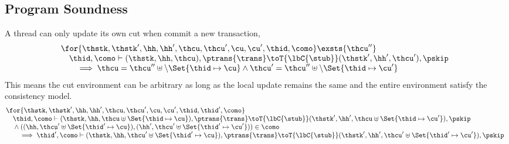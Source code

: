 \subsection{Program Soundness}
\begin{lem}
\label{lem:locality-cut}
A thread can only update its own cut when commit a new transaction,
\[
\begin{array}{@{}l}
    \for{\thstk, \thstk', \hh, \hh', \thcu, \thcu', \cu, \cu', \thid, \como} \exsts{\thcu''} \\
    \quad \thid, \como \vdash (\thstk, \hh, \thcu), \ptrans{\trans} \toT{\lbC{\stub}} (\thstk', \hh', \thcu'), \pskip \\
    \qquad \implies \thcu  = \thcu'' \uplus \setminus \Set{\thid \mapsto \cu } \land \thcu' = \thcu'' \uplus \setminus \Set{ \thid \mapsto \cu' }
\end{array}
\]
This means the cut environment can be arbitrary as long as the local update remains the same and the entire environment satisfy the consistency model.
\[
\begin{array}{@{}l}
    \for{\thstk, \thstk', \hh, \hh', \thcu, \thcu', \cu, \cu', \thid, \thid', \como} \\
    \quad \thid, \como \vdash (\thstk, \hh, \thcu \uplus \Set{\thid \mapsto \cu}), \ptrans{\trans} \toT{\lbC{\stub}} (\thstk', \hh', \thcu \uplus \Set{\thid \mapsto \cu'}), \pskip \\
    \quad {} \land ((\hh,\thcu' \uplus \Set{\thid' \mapsto \cu}),(\hh',\thcu' \uplus \Set{\thid' \mapsto \cu'})) \in \como \\
    \qquad \implies \thid', \como \vdash (\thstk, \hh, \thcu' \uplus \Set{\thid' \mapsto \cu}), \ptrans{\trans} \toT{\lbC{\stub}} (\thstk', \hh', \thcu' \uplus \Set{\thid' \mapsto \cu'}), \pskip \\
\end{array}
\]
\end{lem}
